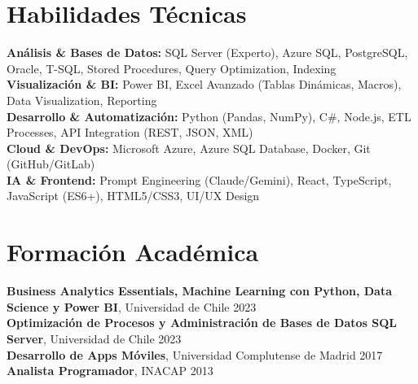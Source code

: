 \documentclass[11pt,letterpaper]{article}
\begin{document}
\section{Habilidades T\'{e}cnicas}
\textbf{Análisis \& Bases de Datos:} SQL Server (Experto), Azure SQL, PostgreSQL, Oracle, T-SQL, Stored Procedures, Query Optimization, Indexing \\
\textbf{Visualización \& BI:} Power BI, Excel Avanzado (Tablas Dinámicas, Macros), Data Visualization, Reporting \\
\textbf{Desarrollo \& Automatización:} Python (Pandas, NumPy), C\#, Node.js, ETL Processes, API Integration (REST, JSON, XML) \\
\textbf{Cloud \& DevOps:} Microsoft Azure, Azure SQL Database, Docker, Git (GitHub/GitLab) \\
\textbf{IA \& Frontend:} Prompt Engineering (Claude/Gemini), React, TypeScript, JavaScript (ES6+), HTML5/CSS3, UI/UX Design

\section{Formaci\'{o}n Acad\'{e}mica}
\textbf{Business Analytics Essentials, Machine Learning con Python, Data Science y Power BI}, Universidad de Chile \hfill 2023 \\
\textbf{Optimización de Procesos y Administración de Bases de Datos SQL Server}, Universidad de Chile \hfill 2023 \\
\textbf{Desarrollo de Apps Móviles}, Universidad Complutense de Madrid \hfill 2017 \\
\textbf{Analista Programador}, INACAP \hfill 2013
\end{document}
